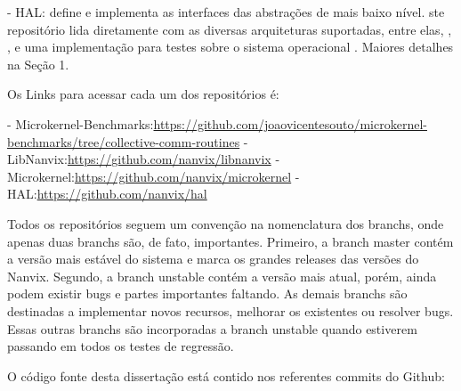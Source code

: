 - HAL: define e implementa as interfaces das abstrações de mais baixo nível.
ste repositório lida diretamente com as diversas arquiteturas suportadas, entre elas,
\mppa, \optimsoc, \hero e uma implementação para testes sobre o sistema operacional \unix.
Maiores detalhes na Seção 1.

Os Links para acessar cada um dos repositórios é:

- Microkernel-Benchmarks:\url{https://github.com/joaovicentesouto/microkernel-benchmarks/tree/collective-comm-routines}
- LibNanvix:\url{https://github.com/nanvix/libnanvix}
- Microkernel:\url{https://github.com/nanvix/microkernel}
- HAL:\url{https://github.com/nanvix/hal}

\label{sec:code-version}

Todos os repositórios seguem um convenção na nomenclatura dos branchs, onde apenas duas branchs
são, de fato, importantes.
Primeiro, a branch master contém a versão mais estável do sistema e marca os grandes releases das versões do Nanvix.
Segundo, a branch unstable contém a versão mais atual, porém, ainda podem existir bugs e partes importantes faltando.
As demais branchs são destinadas a implementar novos recursos, melhorar os existentes ou resolver bugs.
Essas outras branchs são incorporadas a branch unstable quando estiverem passando em todos os testes de regressão.

O código fonte desta dissertação está contido nos referentes commits do Github:

